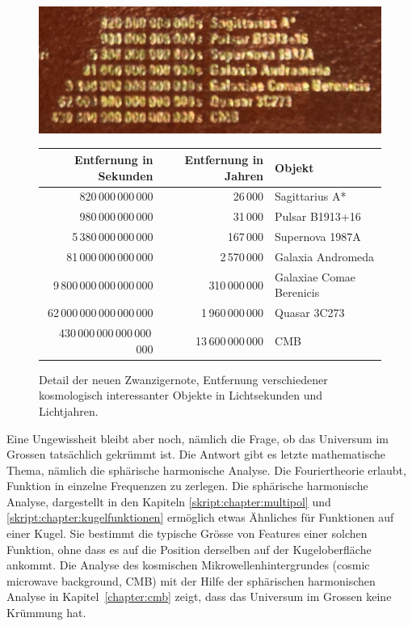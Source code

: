 \begin{figure}
\begin{center}
\includegraphics[width=0.7\hsize]{chapters/images/notendetail2.jpg}
\medskip

\begin{tabular}{|r|r|l|}
\hline
 Entfernung in Sekunden  &Entfernung in Jahren&Objekt                  \\
\hline
          820\,000\,000\,000&          26\,000&Sagittarius A*          \\
          980\,000\,000\,000&          31\,000&Pulsar B1913+16         \\
       5\,380\,000\,000\,000&         167\,000&Supernova 1987A         \\
      81\,000\,000\,000\,000&      2\,570\,000&Galaxia Andromeda       \\
  9\,800\,000\,000\,000\,000&    310\,000\,000&Galaxiae Comae Berenicis\\
 62\,000\,000\,000\,000\,000& 1\,960\,000\,000&Quasar 3C273            \\
430\,000\,000\,000\,000\,000&13\,600\,000\,000&CMB                     \\
\hline
\end{tabular}
\end{center}
\caption{Detail der neuen Zwanzigernote, Entfernung verschiedener
kosmologisch interessanter Objekte in Lichtsekunden und Lichtjahren.
\label{skript:einleitung:detail}}
\end{figure}


Eine Ungewissheit bleibt aber noch, nämlich die Frage, ob das
Universum im Grossen tatsächlich gekrümmt ist.
Die Antwort gibt es letzte mathematische Thema, nämlich die
sphärische harmonische Analyse.
Die Fouriertheorie erlaubt, Funktion in einzelne Frequenzen zu
zerlegen.
Die sphärische harmonische Analyse, dargestellt in den Kapiteln
\ref{skript:chapter:multipol} und \ref{skript:chapter:kugelfunktionen}
ermöglich etwas Ähnliches für Funktionen auf einer Kugel. 
Sie bestimmt die typische Grösse von Features einer solchen
Funktion, ohne dass es auf die Position derselben auf der Kugeloberfläche
ankommt.
Die Analyse des kosmischen Mikrowellenhintergrundes (cosmic microwave
background, CMB) mit der Hilfe der sphärischen harmonischen Analyse
in Kapitel~\ref{chapter:cmb} zeigt, dass das Universum im Grossen
keine Krümmung hat.

